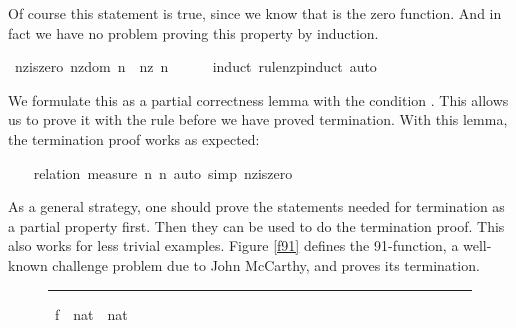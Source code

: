 \begin{isabellebody}
\begin{isamarkuptxt}
  Of course this statement is true, since we know that  is
  the zero function. And in fact we have no problem proving this
  property by induction.%
\end{isamarkuptxt}%
\isamarkuptrue%
\isamarkupfalse%
%
\endisatagproof
{\isafoldproof}%
%
\isadelimproof
\isanewline
%
\endisadelimproof
\isanewline
{}\isamarkupfalse%
\ nz{\isacharunderscore}is{\isacharunderscore}zero{\isacharcolon}\ {\isachardoublequoteopen}nz{\isacharunderscore}dom\ n\ {\isasymLongrightarrow}\ nz\ n\ {\isacharequal}\ {}{\isachardoublequoteclose}\isanewline
%
\isadelimproof
\ \ %
\endisadelimproof
%
\isatagproof
{}\isamarkupfalse%
\ {\isacharparenleft}induct\ rule{\isacharcolon}nz{\isachardot}pinduct{\isacharparenright}\ auto%
\endisatagproof
{\isafoldproof}%
%
\isadelimproof
%
\endisadelimproof
%
\begin{isamarkuptext}%
We formulate this as a partial correctness lemma with the condition
  . This allows us to prove it with the  rule before we have proved termination. With this lemma,
  the termination proof works as expected:%
\end{isamarkuptext}%
\isamarkuptrue%
\isamarkupfalse%
\isanewline
%
\isadelimproof
\ \ %
\endisadelimproof
%
\isatagproof
{}\isamarkupfalse%
\ {\isacharparenleft}relation\ {\isachardoublequoteopen}measure\ {\isacharparenleft}{\isasymlambda}n{\isachardot}\ n{\isacharparenright}{\isachardoublequoteclose}{\isacharparenright}\ {\isacharparenleft}auto\ simp{\isacharcolon}\ nz{\isacharunderscore}is{\isacharunderscore}zero{\isacharparenright}%
\endisatagproof
{\isafoldproof}%
%
\isadelimproof
%
\endisadelimproof
%
\begin{isamarkuptext}%
As a general strategy, one should prove the statements needed for
  termination as a partial property first. Then they can be used to do
  the termination proof. This also works for less trivial
  examples. Figure \ref{f91} defines the 91-function, a well-known
  challenge problem due to John McCarthy, and proves its termination.%
\end{isamarkuptext}%
\isamarkuptrue%
%
\begin{figure}
\hrule\vspace{6pt}
\begin{minipage}{0.8\textwidth}
\isastyle\isamarkuptrue
{}\isamarkupfalse%
\ f{}{}\ {\isacharcolon}{\isacharcolon}\ {\isachardoublequoteopen}nat\ {\isasymRightarrow}\ nat{\isachardoublequoteclose}\isanewline

\end{minipage}
\end{figure}
\end{isabellebody}

